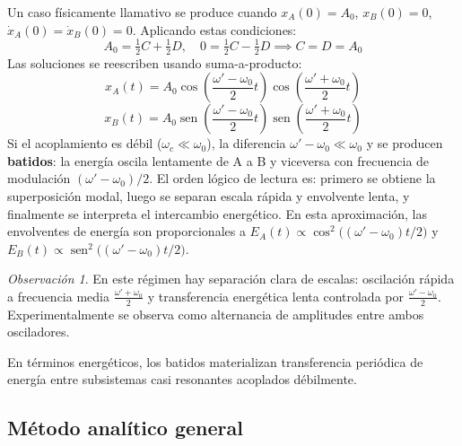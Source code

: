 \documentclass[12pt, a4paper]{article}
\theoremstyle{plain}
\theoremstyle{definition}
\theoremstyle{remark}
\newtheorem*{observacion}{Observación}
\DeclareMathOperator{\sen}{sen}
\begin{document}
Un caso físicamente llamativo se produce cuando $x_A(0)=A_0$, $x_B(0)=0$,
$\dot{x}_A(0)=\dot{x}_B(0)=0$. Aplicando estas condiciones:
\begin{equation}
  A_0 = \tfrac{1}{2}C + \tfrac{1}{2}D,\quad
  0   = \tfrac{1}{2}C - \tfrac{1}{2}D
  \implies C = D = A_0
\end{equation}
Las soluciones se reescriben usando suma-a-producto:
\begin{equation}
  x_A(t) = A_0\cos\!\left(\frac{\omega'-\omega_0}{2}t\right)
              \cos\!\left(\frac{\omega'+\omega_0}{2}t\right)
\end{equation}
\begin{equation}
  x_B(t) = A_0\sen\!\left(\frac{\omega'-\omega_0}{2}t\right)
              \sen\!\left(\frac{\omega'+\omega_0}{2}t\right)
\end{equation}
Si el acoplamiento es débil ($\omega_c \ll \omega_0$), la diferencia
$\omega'-\omega_0 \ll \omega_0$ y se producen \textbf{batidos}: la energía oscila
lentamente de A a B y viceversa con frecuencia de modulación $(\omega'-\omega_0)/2$.
El orden lógico de lectura es: primero se obtiene la superposición modal, luego se separan
escala rápida y envolvente lenta, y finalmente se interpreta el intercambio energético.
En esta aproximación, las envolventes de energía son proporcionales a
$E_A(t)\propto \cos^2\!\bigl((\omega'-\omega_0)t/2\bigr)$ y
$E_B(t)\propto \sen^2\!\bigl((\omega'-\omega_0)t/2\bigr)$.
\begin{observacion}
En este régimen hay separación clara de escalas: oscilación rápida a frecuencia media
$\tfrac{\omega'+\omega_0}{2}$ y transferencia energética lenta controlada por
$\tfrac{\omega'-\omega_0}{2}$. Experimentalmente se observa como alternancia de amplitudes
entre ambos osciladores.
\end{observacion}
En términos energéticos, los batidos materializan transferencia periódica de energía entre
subsistemas casi resonantes acoplados débilmente.

\subsection{Método analítico general}
\end{document}
